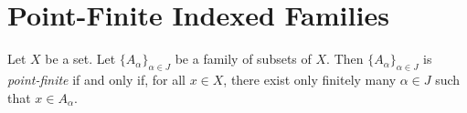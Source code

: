 \section{Point-Finite Indexed Families}

\begin{definition}
    Let $X$ be a set. Let $\{ A_\alpha \}_{\alpha \in J}$ be a family of subsets of $X$.
    Then $\{ A_\alpha \}_{\alpha \in J}$ is \emph{point-finite} if and only if,
    for all $x \in X$, there exist only finitely many $\alpha \in J$ such that $x \in A_\alpha$.
\end{definition}
